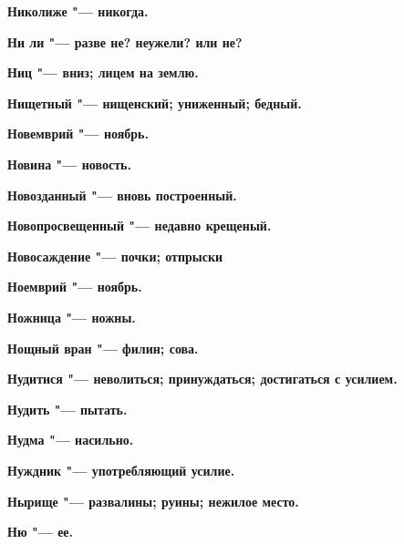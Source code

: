 \bfseries Николиже \normalfont{} "--- никогда. 




\bfseries Ни ли \normalfont{} "--- разве не? неужели? или не? 




\bfseries Ниц \normalfont{} "--- вниз; лицем на землю. 




\bfseries Нищетный \normalfont{} "--- нищенский; униженный; бедный. 




\bfseries Новемврий \normalfont{} "--- ноябрь. 




\bfseries Новина \normalfont{} "--- новость. 




\bfseries Новозданный \normalfont{} "--- вновь построенный. 




\bfseries Новопросвещенный \normalfont{} "--- недавно крещеный. 




\bfseries Новосаждение \normalfont{} "--- почки; отпрыски 




\bfseries Ноемврий \normalfont{} "--- ноябрь. 




\bfseries Ножница \normalfont{} "--- ножны. 




\bfseries Нощный вран \normalfont{} "--- филин; сова. 




\bfseries Нудитися \normalfont{} "--- неволиться; принуждаться; достигаться с усилием. 




\bfseries Нудить \normalfont{} "--- пытать. 




\bfseries Нудма \normalfont{} "--- насильно. 




\bfseries Нуждник \normalfont{} "--- употребляющий усилие. 




\bfseries Нырище \normalfont{} "--- развалины; руины; нежилое место. 




\bfseries Ню \normalfont{} "--- ее. 




 





